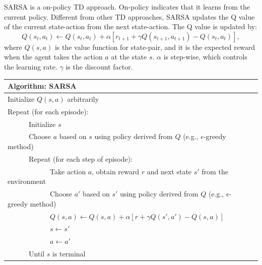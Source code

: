 \label{sec:SARSA}
SARSA is a on-policy TD approach. On-policy indicates that it learns from the current policy.
Different from other TD approaches, SARSA updates the Q value of the current state-action from the next state-action.
The Q value is updated by:
\begin{displaymath}
    Q(s_t, a_t) \leftarrow Q(s_t, a_t) + \alpha [r_{t+1} + \gamma Q(s_{t+1}, a_{t+1})-Q(s_t, a_t)],
\end{displaymath}
where $Q(s, a)$ is the value function for state-pair, and it is the expected reward when the agent takes
the action $a$ at the state $s$. $\alpha$ is step-wise, which controls the learning rate. 
$\gamma$ is the discount factor.


\begin{center}
\begin{tabular}{@{}lp{6cm}@{}}
\hline
Algorithm: SARSA\\
\hline
Initialize $Q(s, a)$ arbitrarily\\
Repeat (for each episode):\\
\ \ \ \ \ \ Initialize $s$\\
\ \ \ \ \ \ Choose $a$ based on $s$ using policy derived from $Q$ (e.g., $\epsilon$-greedy method)\\
\ \ \ \ \ \ Repeat (for each step of episode):\\
\ \ \ \ \ \ \ \ \ \ \ \ Take action $a$, obtain reward $r$ and next state $s'$ from the environment\\
\ \ \ \ \ \ \ \ \ \ \ \ Choose $a'$ based on $s'$ using policy derived from $Q$ (e.g., $\epsilon$-greedy method)\\
\ \ \ \ \ \ \ \ \ \ \ \ $Q(s, a) \leftarrow Q(s, a) + \alpha [r + \gamma Q(s', a')-Q(s, a)]$\\
\ \ \ \ \ \ \ \ \ \ \ \ $s \leftarrow s'$\\
\ \ \ \ \ \ \ \ \ \ \ \ $a \leftarrow a'$\\
\ \ \ \ \ \ Until $s$ is terminal\\
\hline  
\end{tabular}
\end{center}


